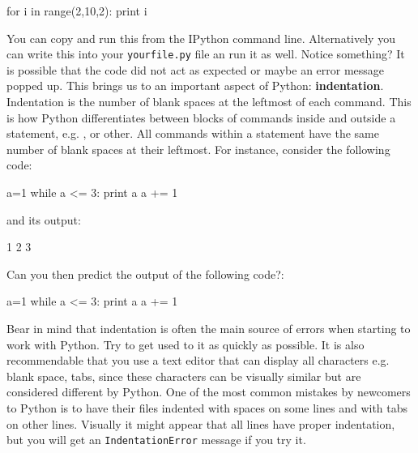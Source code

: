 \begin{python}
for i in range(2,10,2):
    print i
\end{python}

You can copy and run this from the IPython command line. Alternatively you can write this into your \texttt{yourfile.py} file an run it as well. Notice something? It is possible that the code did not act as expected or maybe an error message popped up. This brings us to an important aspect of Python: \textbf{indentation}. Indentation is the number of blank spaces at the leftmost of each command. This is how Python differentiates between blocks of commands inside and outside a statement, e.g. ,  or other. All commands within a statement have the same number of blank spaces at their leftmost. For instance, consider the following code: 

\begin{python}
a=1
while a <= 3:
    print a
    a += 1
\end{python}

\noindent and its output:

\begin{python}
1
2
3
\end{python}


\begin{exercise}
Can you then predict the output of the following code?:

\begin{python}
a=1
while a <= 3:
    print a
a += 1
\end{python}

\end{exercise}

\noindent Bear in mind that indentation is often the main source of errors when starting to work with Python. Try to get used to it as quickly as possible. It is also recommendable that you use a text editor that can display all characters e.g. blank space, tabs, since these characters can be visually similar but are considered different by Python. One of the most common mistakes by newcomers to Python is to have their files indented with spaces on some lines and with tabs on other lines. Visually it might appear that all lines have proper indentation, but you will get an \texttt{IndentationError} message if you try it.



